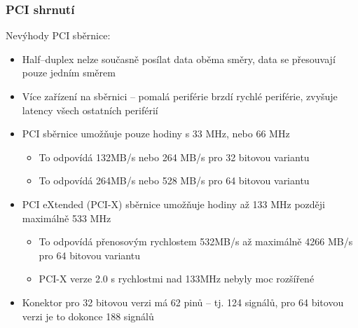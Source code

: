 \documentclass{beamer}
\begin{document}
\begin{frame}
\frametitle{PCI shrnutí}

Nevýhody PCI sběrnice:
\begin{itemize}
\item Half--duplex nelze současně posílat data oběma směry, data se přesouvají pouze jedním směrem
\item Více zařízení na sběrnici -- pomalá periférie brzdí rychlé periférie, zvyšuje latency všech ostatních periférií
\item PCI sběrnice umožňuje pouze hodiny s 33 MHz, nebo 66 MHz
\begin{itemize}
\item To odpovídá 132MB/s nebo 264 MB/s pro 32 bitovou variantu
\item To odpovídá 264MB/s nebo 528 MB/s pro 64 bitovou variantu
\end{itemize}
\item PCI eXtended (PCI-X) sběrnice umožňuje hodiny až 133 MHz později maximálně 533 MHz
\begin{itemize}
\item To odpovídá přenosovým rychlostem 532MB/s až maximálně 4266 MB/s pro 64 bitovou variantu
\item PCI-X verze 2.0 s rychlostmi nad 133MHz nebyly moc rozšířené 
\end{itemize}
\item Konektor pro 32 bitovou verzi má 62 pinů -- tj. 124 signálů, pro 64 bitovou verzi je to dokonce 188 signálů  
\end{itemize}

\end{frame}
\end{document}
